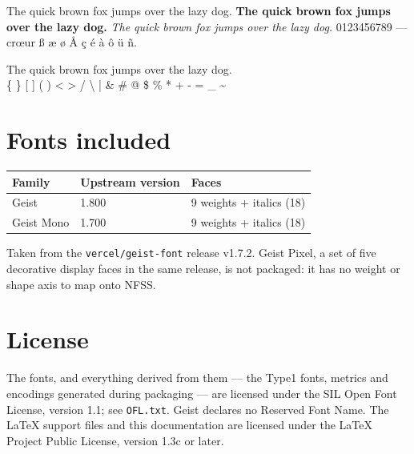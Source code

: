 \documentclass[11pt]{article}
\begin{document}
{\fontsize{9}{12}\selectfont
The quick brown fox jumps over the lazy dog. \textbf{The quick brown fox jumps
over the lazy dog.} \textit{The quick brown fox jumps over the lazy dog.}
0123456789 --- \guillemotleft cr\oe ur\guillemotright{} \ss{} \ae{} \o{}
\AA{} \c{c} \'e \`a \^o \"u \~n.
\par}

\medskip

{\fontsize{9}{12}\ttfamily\selectfont
The quick brown fox jumps over the lazy dog.\\
\{ \} [ ] ( ) < > / \textbackslash{} | \& \# @ \$ \% * + - = \_ \textasciitilde
\par}

\section{Fonts included}

\begin{tabular}{@{}lll@{}}
\toprule
Family & Upstream version & Faces \\
\midrule
Geist      & 1.800 & 9 weights + italics (18) \\
Geist Mono & 1.700 & 9 weights + italics (18) \\
\bottomrule
\end{tabular}

\medskip\noindent
Taken from the \texttt{vercel/geist-font} release v1.7.2. Geist Pixel, a set of
five decorative display faces in the same release, is not packaged: it has no
weight or shape axis to map onto NFSS.

\section{License}

The fonts, and everything derived from them --- the Type1 fonts, metrics and
encodings generated during packaging --- are licensed under the SIL Open Font
License, version 1.1; see \texttt{OFL.txt}. Geist declares no Reserved Font
Name. The LaTeX support files and this documentation are licensed under the
LaTeX Project Public License, version 1.3c or later.
\end{document}
